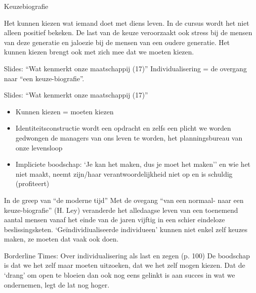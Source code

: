 \documentclass[main.tex]{subfiles}
\begin{document}
\begin{examenvraag}
    \begin{vraag}
        Keuzebiografie
    \end{vraag}

    \begin{antwoord}
        Het kunnen kiezen wat iemand doet met diens leven.
        In de cursus wordt het niet alleen positief bekeken.
        De last van de keuze veroorzaakt ook stress bij de mensen van deze generatie en jaloezie bij de mensen van een oudere generatie.
        Het kunnen kiezen brengt ook met zich mee dat we moeten kiezen.
        \begin{citaat}{Slides: ``Wat kenmerkt onze maatschappij (17)''}
            Individualisering = de overgang naar ``een keuze-biografie''.
        \end{citaat}
        \begin{citaat}{Slides: ``Wat kenmerkt onze maatschappij (17)''}
            \begin{itemize}
                \item Kunnen kiezen = moeten kiezen
                \item Identiteitsconstructie wordt een opdracht en zelfs een plicht we worden gedwongen de managers van ons leven te worden, het planningsbureau van onze levensloop
                \item Impliciete boodschap: `Je kan het maken, dus je moet het maken'' en wie het niet maakt, neemt zijn/haar verantwoordelijkheid niet op en is schuldig (profiteert)
            \end{itemize}
        \end{citaat}
        \begin{citaat}{In de greep van ``de moderne tijd''}
            Met de ovegang ``van een normaal- naar een keuze-biografie'' (H. Ley) veranderde het alledaagse leven van een toenemend aantal mensen vanaf het einde van de jaren vijftig in een schier eindeloze beslissingsketen.
            `Ge\"individiualiseerde individueen' kunnen niet enkel zelf keuzes maken, ze moeten dat vaak ook doen.
        \end{citaat}
        \begin{citaat}{Borderline Times: Over individualisering als last en zegen (p. 100)}
            De boodschap is dat we het zelf maar moeten uitzoeken, dat we het zelf mogen kiezen.
            Dat de `drang' om open te bloeien dan ook nog eens gelinkt is aan succes in wat we ondernemen, legt de lat nog hoger.
        \end{citaat}

\end{antwoord}
\end{examenvraag}
\end{document}
